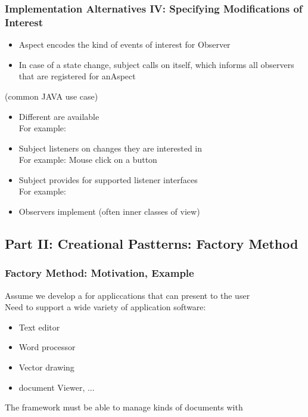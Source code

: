 \subsubsection{Implementation Alternatives IV: Specifying Modifications of Interest}
\begin{itemize}
    \item {} 
    Aspect encodes the kind of events of interest for  Observer
    \item In case of a state change, subject calls  on itself, which informs all observers that are registered for anAspect
\end{itemize}
 (common JAVA use case)
\begin{itemize}
    \item Different  are available\\
    For example: 
    \item Subject  listeners on changes they are interested in\\
    For example: Mouse click on a button
    \item Subject provides  for supported listener interfaces \\
    For example: 
    \item Observers implement  (often inner classes of view)
\end{itemize}
\subsection{Part II: Creational Pastterns: Factory Method}
\subsubsection{Factory Method: Motivation, Example}
Assume we develop a  for appliccations that can present  to the user\\
Need to support a wide variety of application software:
\begin{itemize}
    \item Text editor 
    \item Word processor
    \item Vector drawing 
    \item document Viewer, ...
\end{itemize}
\begin{defBox}
    The framework must be able to manage  kinds of documents with 
\end{defBox} 
\clearpage
